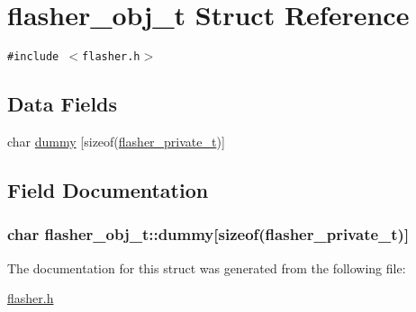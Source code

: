 \hypertarget{structflasher__obj__t}{
\section{flasher\_\-obj\_\-t Struct Reference}
\label{structflasher__obj__t}
}
{\tt \#include $<$flasher.h$>$}

\subsection*{Data Fields}
\begin{CompactItemize}
\item 
char \hyperlink{structflasher__obj__t_a3968aafba4e948e01f3f01ac017e394}{dummy} \mbox{[}sizeof(\hyperlink{structflasher__private__t}{flasher\_\-private\_\-t})\mbox{]}
\end{CompactItemize}


\subsection{Field Documentation}
\hypertarget{structflasher__obj__t_a3968aafba4e948e01f3f01ac017e394}{
\subsubsection{\setlength{\rightskip}{0pt plus 5cm}char {\bf flasher\_\-obj\_\-t::dummy}\mbox{[}sizeof({\bf flasher\_\-private\_\-t})\mbox{]}}}
\label{structflasher__obj__t_a3968aafba4e948e01f3f01ac017e394}




The documentation for this struct was generated from the following file:\begin{CompactItemize}
\item 
\hyperlink{flasher_8h}{flasher.h}\end{CompactItemize}
